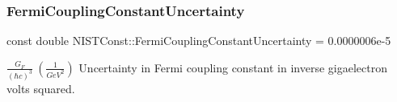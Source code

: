 \subsubsection{\texorpdfstring{Fermi\+Coupling\+Constant\+Uncertainty}{FermiCouplingConstantUncertainty}}
{\footnotesize\ttfamily const double N\+I\+S\+T\+Const\+::\+Fermi\+Coupling\+Constant\+Uncertainty = 0.\+0000006e-\/5}

$\frac{G_F}{(\hbar c)^3} \ (\frac{1}{GeV^2})$ Uncertainty in Fermi coupling constant in inverse gigaelectron volts squared. 